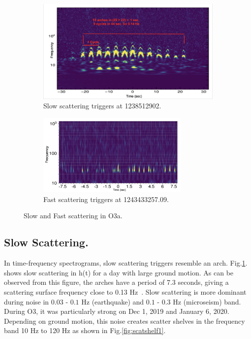 \documentclass[12pt]{iopart}
\begin{document}
\begin{figure}[h]
   \centering
    \begin{subfigure}[b]{0.45\textwidth}
        \centering
         \includegraphics[width= \textwidth]{slowarch.png}
         \caption{Slow scattering triggers at 1238512902.}
         \label{fig:slowscat}
    \end{subfigure}
    \hfill
    \begin{subfigure}[b]{0.5\textwidth}
        \centering
         \includegraphics[width =\textwidth,height=4cm]{fastscat3.png}
         \caption{Fast scattering triggers at 1243433257.09.}
         \label{fig:fastscat}
         
    
    \end{subfigure}
    \caption{Slow and Fast scattering in O3a.}
    \label{fig:fastslowscat}
    
\end{figure}

\subsection{Slow Scattering.}
In time-frequency spectrograms, slow scattering triggers resemble an arch.  Fig.\ref{fig:slowscat}. shows slow scattering in h(t) for a day with large ground motion.  As can be observed from this figure, the arches have a period of 7.3 seconds, giving a scattering surface frequency close to 0.13 Hz~\cite{alogsid}. 
Slow scattering is more dominant during noise in $0.03$ - $0.1$ Hz (earthquake) and $0.1$ - $0.3$  Hz (microseism) band. During O3, it was particularly strong on Dec 1, 2019 and January 6, 2020.  Depending on ground motion, this noise creates scatter shelves in the frequency band 10 Hz to 120 Hz as shown in Fig.\ref{fig:scatshelf1}.
\end{document}
